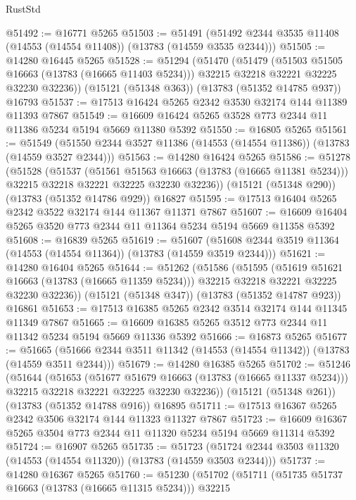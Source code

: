 \begin{lexlean}{RustStd}
\begin{coremodule}
@51492 := @16771 @5265
@51503 := @51491 (@51492 @2344 @3535 @11408 (@14553 (@14554 @11408)) (@13783 (@14559 @3535 @2344)))
@51505 := @14280 @16445 @5265
@51528 := @51294
    (@51470
      (@51479
        (@51503 @51505 @16663 (@13783 (@16665 @11403 @5234)))
        @32215
        @32218
        @32221
        @32225
        @32230
        @32236))
    (@15121 (@51348 @363))
    (@13783 (@51352 @14785 @937))
    @16793
@51537 := @17513 @16424 @5265 @2342 @3530 @32174 @144 @11389 @11393 @7867
@51549 := @16609 @16424 @5265 @3528 @773 @2344 @11 @11386 @5234 @5194 @5669 @11380 @5392
@51550 := @16805 @5265
@51561 := @51549 (@51550 @2344 @3527 @11386 (@14553 (@14554 @11386)) (@13783 (@14559 @3527 @2344)))
@51563 := @14280 @16424 @5265
@51586 := @51278
    (@51528
      (@51537
        (@51561 @51563 @16663 (@13783 (@16665 @11381 @5234)))
        @32215
        @32218
        @32221
        @32225
        @32230
        @32236))
    (@15121 (@51348 @290))
    (@13783 (@51352 @14786 @929))
    @16827
@51595 := @17513 @16404 @5265 @2342 @3522 @32174 @144 @11367 @11371 @7867
@51607 := @16609 @16404 @5265 @3520 @773 @2344 @11 @11364 @5234 @5194 @5669 @11358 @5392
@51608 := @16839 @5265
@51619 := @51607 (@51608 @2344 @3519 @11364 (@14553 (@14554 @11364)) (@13783 (@14559 @3519 @2344)))
@51621 := @14280 @16404 @5265
@51644 := @51262
    (@51586
      (@51595
        (@51619 @51621 @16663 (@13783 (@16665 @11359 @5234)))
        @32215
        @32218
        @32221
        @32225
        @32230
        @32236))
    (@15121 (@51348 @347))
    (@13783 (@51352 @14787 @923))
    @16861
@51653 := @17513 @16385 @5265 @2342 @3514 @32174 @144 @11345 @11349 @7867
@51665 := @16609 @16385 @5265 @3512 @773 @2344 @11 @11342 @5234 @5194 @5669 @11336 @5392
@51666 := @16873 @5265
@51677 := @51665 (@51666 @2344 @3511 @11342 (@14553 (@14554 @11342)) (@13783 (@14559 @3511 @2344)))
@51679 := @14280 @16385 @5265
@51702 := @51246
    (@51644
      (@51653
        (@51677 @51679 @16663 (@13783 (@16665 @11337 @5234)))
        @32215
        @32218
        @32221
        @32225
        @32230
        @32236))
    (@15121 (@51348 @261))
    (@13783 (@51352 @14788 @916))
    @16895
@51711 := @17513 @16367 @5265 @2342 @3506 @32174 @144 @11323 @11327 @7867
@51723 := @16609 @16367 @5265 @3504 @773 @2344 @11 @11320 @5234 @5194 @5669 @11314 @5392
@51724 := @16907 @5265
@51735 := @51723 (@51724 @2344 @3503 @11320 (@14553 (@14554 @11320)) (@13783 (@14559 @3503 @2344)))
@51737 := @14280 @16367 @5265
@51760 := @51230
    (@51702
      (@51711
        (@51735 @51737 @16663 (@13783 (@16665 @11315 @5234)))
        @32215

\end{coremodule}
\end{lexlean}
